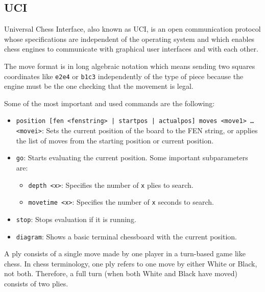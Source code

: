 \subsection{UCI}

Universal Chess Interface, also known as UCI, is an open communication protocol whose specifications are independent of the operating system and which enables chess engines to communicate with graphical user interfaces and with each other.

\vspace{1em}

\noindent The move format is in long algebraic notation which means sending two squares coordinates like \texttt{e2e4} or \texttt{b1c3} independently of the type of piece because the engine must be the one checking that the movement is legal.

\vspace{1em}

\noindent Some of the most important and used commands are the following:

\begin{itemize}[itemsep=1pt]
    \item \texttt{position [fen <fenstring> | startpos | actualpos] moves <move1> \ldots \\<movei>}: Sets the current position of the board to the FEN string, or applies the list of moves from the starting position or current position.

    \item \texttt{go}: Starts evaluating the current position. Some important subparameters are:
    \begin{itemize}[itemsep=1pt]
        \item \texttt{depth <x>}: Specifies the number of \texttt{x} plies to search.
        \item \texttt{movetime <x>}: Specifies the number of \texttt{x} seconds to search. 
    \end{itemize}

    \item \texttt{stop}: Stops evaluation if it is running.
    \item \texttt{diagram}: Shows a basic terminal chessboard with the current position.
\end{itemize}

\noindent A ply consists of a single move made by one player in a turn-based game like chess. In chess terminology, one ply refers to one move by either White or Black, not both. Therefore, a full turn (when both White and Black have moved) consists of two plies.

